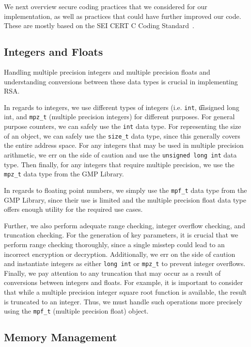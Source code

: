 \documentclass[letterpaper]{article}
\begin{document}
We next overview secure coding practices that we considered for our implementation, as well as practices that could have further improved our code. These are mostly based on the SEI CERT C Coding Standard~\cite{seacord2008cert}.

\subsection{Integers and Floats}

Handling multiple precision integers and multiple precision floats and understanding conversions between these data types is crucial in implementing RSA.

In regards to integers, we use different types of integers (i.e. {\tt int}, {\t unsigned long int}, and {\tt mpz\_t} (multiple precision integers) for different purposes. For general purpose counters, we can safely use the {\tt int} data type. For representing the size of an object, we can safely use the {\tt size\_t} data type, since this generally covers the entire address space. For any integers that may be used in multiple precision arithmetic, we err on the side of caution
and use the {\tt unsigned long int} data type. Then finally, for any integers that require multiple precision, we use the {\tt mpz\_t} data type from the GMP Library.

In regards to floating point numbers, we simply use the {\tt mpf\_t} data type from the GMP Library, since their use is limited and the multiple precision float data type offers enough utility for the required use cases.

Further, we also perform adequate range checking, integer overflow checking, and truncation checking. For the generation of key parameters, it is crucial that we perform range checking thoroughly, since a
single misstep could lead to an incorrect encryption or decryption. Additionally, we err on the side of caution and instantiate integers as either {\tt long int} or {\tt mpz\_t} to prevent integer overflows. Finally, we pay attention to any truncation that may occur as a result of conversions between integers and floats. For example, it is important to consider that while a multiple precision integer square root function is available, the result is
truncated to an integer. Thus, we must handle such operations more precisely using the {\tt mpf\_t} (multiple precision float) object.

\subsection{Memory Management}
\end{document}
